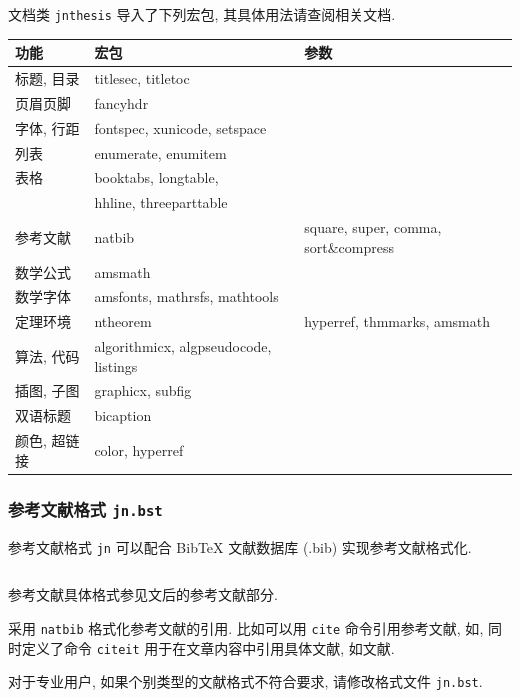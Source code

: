 文档类 {\tt jnthesis} 导入了下列宏包,
其具体用法请查阅相关文档.

\begin{tabular}{lll}
\hline
功能 & 宏包 & 参数\\
\hline
标题, 目录 & titlesec, titletoc &\\
页眉页脚 & fancyhdr &\\
字体, 行距 & fontspec, xunicode, setspace &\\
列表 & enumerate, enumitem\\
表格 & booktabs, longtable, &\\
& hhline, threeparttable & \\
参考文献 & natbib & square, super, comma, sort\&compress\\
\hline
数学公式 & amsmath & \\
数学字体 & amsfonts, mathrsfs, mathtools & \\
定理环境 & ntheorem & hyperref, thmmarks, amsmath\\
算法, 代码 & algorithmicx, algpseudocode, listings & \\
\hline
插图, 子图 & graphicx, subfig &\\
双语标题 & bicaption &\\
颜色, 超链接 & color, hyperref &\\
\hline
\end{tabular}


\subsubsection*{参考文献格式 {\tt{jn.bst}}}

参考文献格式 {\tt jn} 可以配合 BibTeX 文献数据库 (.bib) 实现参考文献格式化.

\begin{lstlisting}[basicstyle=\ttfamily, frame=single]
  % 指定参考文献格式
\end{lstlisting}

参考文献具体格式参见文后的参考文献部分\cite{Dupont1974,Aho1986,Chen1990,张全福1991,高景德1987,余勇1998,霍夫斯基1981,张竹生1983,竺可桢1973}.

采用 {\tt natbib} 格式化参考文献的引用.
比如可以用 {\tt cite} 命令引用参考文献,
如\cite{Dupont1974,Aho1986,Chen1990,竺可桢1973},
同时定义了命令 {\tt citeit} 用于在文章内容中引用具体文献,
如文献.

对于专业用户, 如果个别类型的文献格式不符合要求, 请修改格式文件 {\tt jn.bst}.

